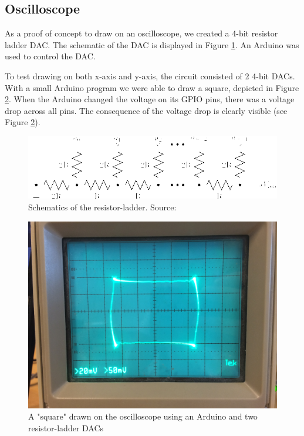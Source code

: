 \subsection{Oscilloscope}
As a proof of concept to draw on an oscilloscope, we created a 4-bit resistor ladder DAC. The schematic of the DAC is displayed in Figure \ref{fig:r2r-ladder}.
An Arduino was used to control the DAC.

To test drawing on both x-axis and y-axis, the circuit consisted of 2 4-bit DACs.
With a small Arduino program we were able to draw a square, depicted in Figure \ref{fig:osc_poc}.
When the Arduino changed the voltage on its GPIO pins, there was a voltage drop across all pins.
The consequence of the voltage drop is clearly visible (see Figure \ref{fig:osc_poc}).


\begin{figure}[h]
\includegraphics[width=\columnwidth]{images/r2r-ladder}
\centering
\caption{Schematics of the resistor-ladder. Source: \cite{r2r-ladder-schematics}}
\label{fig:r2r-ladder}
\end{figure}

\begin{figure}[h]
\includegraphics[width=\columnwidth]{images/osc_square_close}
\centering
\caption{A "square" drawn on the oscilloscope using an Arduino and two resistor-ladder DACs}
\label{fig:osc_poc}
\end{figure}